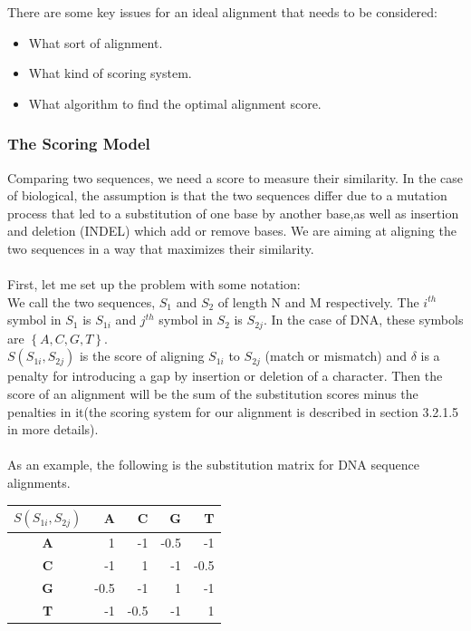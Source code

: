 \documentclass[11pt,a4paper]{report}
\begin{document}
There are some key issues for an ideal alignment that needs to be considered:

\begin{itemize} 
	\item  What sort of alignment.
	\item  What kind of scoring system.
	\item  What algorithm to find the optimal alignment score.
\end{itemize}


\subsubsection{The Scoring Model} \label{The Scoring Model}

Comparing two sequences, we need a score to measure their similarity.
In the case of biological, the assumption is that the two sequences differ
due to a mutation process that led to a substitution 
of one base by another base,as well as insertion and deletion (INDEL) which add or remove bases.
We are aiming at aligning the two sequences in a way that maximizes their similarity.\\ \\
First, let me set up the problem with some notation:\\
We call the two sequences, $S_{1}$ and $S_{2}$ of length N and M respectively. 
The $i^{th}$ symbol in $S_{1}$ is $S_{1i}$ and $j^{th}$ symbol in $S_{2}$ is $S_{2j}$. 
In the case of DNA, these symbols are $\left\{A, C, G, T\right\}$.\\
$S(S_{1i}, S_{2j})$ is the score of aligning $S_{1i}$ to $S_{2j}$ (match or mismatch)
and $\delta$ is a penalty for introducing a gap by insertion or deletion of a character. 
Then the score of an alignment will be the sum of the substitution scores minus the 
penalties in it(the scoring system for our alignment is described in section 3.2.1.5 in more details).\\\\
As an example, the following is the substitution matrix for DNA sequence alignments.


\begin{table}[H]
 \centering
  \begin{tabular}{  c| r  r r  r }
    
  \textbf{  $S(S_{1i}, S_{2j})$ } & \textbf{A} &\textbf{ C} &\textbf{ G} &\textbf{ T} \\ \hline
       \textbf{A} &  1  & -1 & -0.5 & -1 \\
       \textbf{C} & -1  & 1 & -1 & -0.5 \\ 
       \textbf{G} & -0.5 & -1 & 1 & -1 \\ 
       \textbf{T} & -1 & -0.5 & -1 & 1
    \end{tabular}
\label{alignment-exp}
\end{table}
\end{document}
